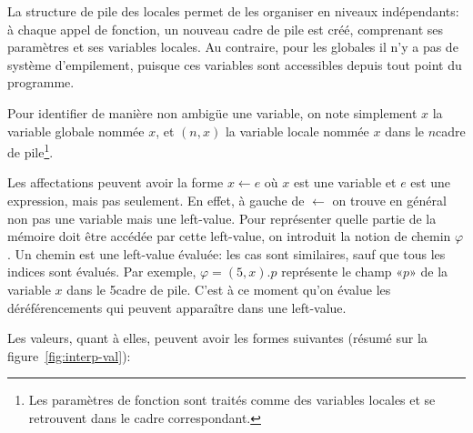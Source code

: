 La structure de pile des locales permet de les organiser en niveaux
indépendants: à \linebreak chaque appel de fonction, un nouveau cadre de pile
est créé, comprenant ses paramètres et ses variables locales. Au contraire, pour
les globales il n'y a pas de système d'empilement, puisque ces variables sont
accessibles depuis tout point du programme.

Pour identifier de manière non ambigüe une variable, on note simplement $x$ la
variable globale nommée $x$, et $(n, x)$ la variable locale nommée $x$ dans le
$n$\ieme cadre de pile\footnote{Les paramètres de fonction sont traités comme
des variables locales et se retrouvent dans le cadre correspondant.}.

Les affectations peuvent avoir la forme $x ← e$ où $x$ est une variable et $e$
est une expression, mais pas seulement. En effet, à gauche de $←$ on trouve en
général non pas une variable mais une left-value. Pour représenter quelle partie
de la mémoire doit être accédée par cette left-value, on introduit la notion de
chemin $φ$. Un chemin est une left-value évaluée: les cas sont similaires, sauf
que tous les indices sont évalués. Par exemple, $φ = (5, x).p$ représente le
champ «$p$» de la variable $x$ dans le 5\ieme cadre de pile. C'est à ce moment
qu'on évalue les déréférencements qui peuvent apparaître dans une left-value.

Les valeurs, quant à elles, peuvent avoir les formes suivantes (résumé sur la
figure~\ref{fig:interp-val}):

